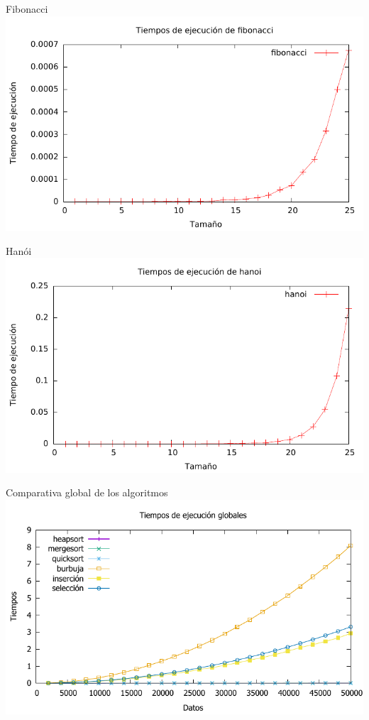 \documentclass[10pt,compress,usetitleprogressbar,mathserif]{beamer}
\begin{document}
\begin{frame}{Fibonacci}
		\includegraphics[width = \textwidth ]{fibonacci_g}
\end{frame}

\begin{frame}{Hanói}
		\includegraphics[width = \textwidth ]{hanoi_g}
\end{frame}

\begin{frame}{Comparativa global de los algoritmos}
		\includegraphics[width = \textwidth ]{comparativa_global_g}
\end{frame}
\end{document}
